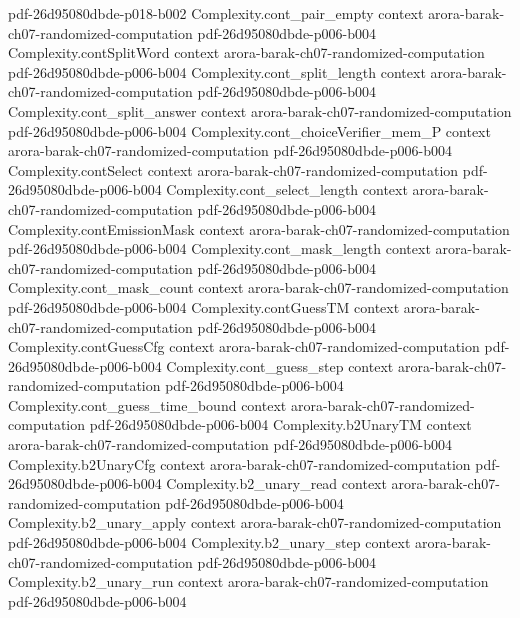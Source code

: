 \begin{theorem}
{    pdf-26d95080dbde-p018-b002}
\proofstep
  {Complexity.cont_pair_empty}
  {context}
  {arora-barak-ch07-randomized-computation}
  {pdf-26d95080dbde-p006-b004}
\proofstep
  {Complexity.contSplitWord}
  {context}
  {arora-barak-ch07-randomized-computation}
  {pdf-26d95080dbde-p006-b004}
\proofstep
  {Complexity.cont_split_length}
  {context}
  {arora-barak-ch07-randomized-computation}
  {pdf-26d95080dbde-p006-b004}
\proofstep
  {Complexity.cont_split_answer}
  {context}
  {arora-barak-ch07-randomized-computation}
  {pdf-26d95080dbde-p006-b004}
\proofstep
  {Complexity.cont_choiceVerifier_mem_P}
  {context}
  {arora-barak-ch07-randomized-computation}
  {pdf-26d95080dbde-p006-b004}
\proofstep
  {Complexity.contSelect}
  {context}
  {arora-barak-ch07-randomized-computation}
  {pdf-26d95080dbde-p006-b004}
\proofstep
  {Complexity.cont_select_length}
  {context}
  {arora-barak-ch07-randomized-computation}
  {pdf-26d95080dbde-p006-b004}
\proofstep
  {Complexity.contEmissionMask}
  {context}
  {arora-barak-ch07-randomized-computation}
  {pdf-26d95080dbde-p006-b004}
\proofstep
  {Complexity.cont_mask_length}
  {context}
  {arora-barak-ch07-randomized-computation}
  {pdf-26d95080dbde-p006-b004}
\proofstep
  {Complexity.cont_mask_count}
  {context}
  {arora-barak-ch07-randomized-computation}
  {pdf-26d95080dbde-p006-b004}
\proofstep
  {Complexity.contGuessTM}
  {context}
  {arora-barak-ch07-randomized-computation}
  {pdf-26d95080dbde-p006-b004}
\proofstep
  {Complexity.contGuessCfg}
  {context}
  {arora-barak-ch07-randomized-computation}
  {pdf-26d95080dbde-p006-b004}
\proofstep
  {Complexity.cont_guess_step}
  {context}
  {arora-barak-ch07-randomized-computation}
  {pdf-26d95080dbde-p006-b004}
\proofstep
  {Complexity.cont_guess_time_bound}
  {context}
  {arora-barak-ch07-randomized-computation}
  {pdf-26d95080dbde-p006-b004}
\proofstep
  {Complexity.b2UnaryTM}
  {context}
  {arora-barak-ch07-randomized-computation}
  {pdf-26d95080dbde-p006-b004}
\proofstep
  {Complexity.b2UnaryCfg}
  {context}
  {arora-barak-ch07-randomized-computation}
  {pdf-26d95080dbde-p006-b004}
\proofstep
  {Complexity.b2_unary_read}
  {context}
  {arora-barak-ch07-randomized-computation}
  {pdf-26d95080dbde-p006-b004}
\proofstep
  {Complexity.b2_unary_apply}
  {context}
  {arora-barak-ch07-randomized-computation}
  {pdf-26d95080dbde-p006-b004}
\proofstep
  {Complexity.b2_unary_step}
  {context}
  {arora-barak-ch07-randomized-computation}
  {pdf-26d95080dbde-p006-b004}
\proofstep
  {Complexity.b2_unary_run}
  {context}
  {arora-barak-ch07-randomized-computation}
  {pdf-26d95080dbde-p006-b004}

\end{theorem}
